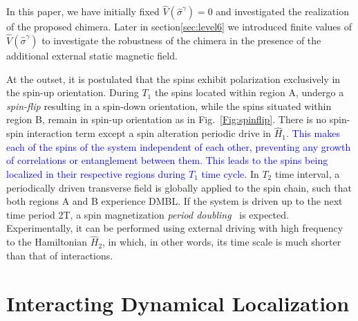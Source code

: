 \documentclass[%
reprint,
superscriptaddress,
amsmath,amssymb,showkeys,
aps,
prb,
]{revtex4-2}
\newcommand{\blue}[1]{\textcolor{blue}{#1}}
\begin{document}
	In this paper, we have initially fixed $\hat{V}(\hat{\sigma}^\gamma)=0$ and investigated the realization of the proposed chimera. Later in section\ref{sec:level6} we introduced finite values of $\hat{V}(\hat{\sigma}^\gamma)$ to investigate the robustness of the chimera in the presence of the additional external static magnetic field.
	
	At the outset, it is postulated that the spins exhibit polarization exclusively in the spin-up orientation. During $T_1$ the spins located within region A, undergo a \textit{spin-flip} resulting in a spin-down orientation, while the spins situated within region B, remain in spin-up orientation as in Fig.~\ref{Fig:spinflip}. There is no spin-spin interaction term except a spin alteration periodic drive in $\hat{H}_1$. \blue{This makes each of the spins of the system independent of each other, preventing any growth of correlations or entanglement between them. This leads to the spins being localized in their respective regions during $T_1$ time cycle}. In $T_2$ time interval, a periodically driven transverse field is globally applied to the spin chain, such that both regions A and B experience DMBL. If the system is driven up to the next time period 2T, a spin magnetization \textit{period doubling}~\cite{rovny_31mathrmp_2018, Pan2020} is expected. Experimentally, it can be performed using external driving with high frequency to the Hamiltonian $\hat{H}_2$, in which, in other words, its time scale is much shorter than that of interactions.~\cite{choi_observation_2017,zhang_observation_2017,Cirac_1995,Blatt_2012}
	
	\section{\label{sec:level2} Interacting Dynamical Localization}
	
\end{document}
